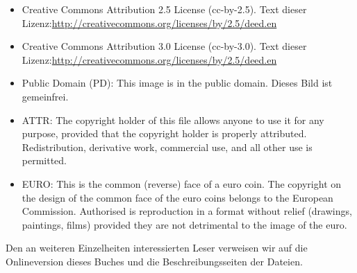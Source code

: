 \begin{small}
\begin{itemize}
\item Creative Commons Attribution 2.5 License (cc-by-2.5). Text dieser Lizenz:\newline{}\url{http://creativecommons.org/licenses/by/2.5/deed.en}

\item Creative Commons Attribution 3.0 License (cc-by-3.0). Text dieser Lizenz:\newline{}\url{http://creativecommons.org/licenses/by/2.5/deed.en}

\item Public Domain (PD): This image is in the public domain. Dieses Bild ist gemeinfrei.

\item ATTR:  The copyright holder of this file allows anyone to use it for any purpose, provided that the copyright holder is properly attributed. Redistribution, derivative work, commercial use, and all other use is permitted. 

\item EURO: This is the common (reverse) face of a euro coin. The copyright on the design of the common face of the euro coins belongs to the European Commission. Authorised is reproduction in a format without relief (drawings, paintings, films) provided they are not detrimental to the image of the euro.
\end{itemize}

Den an weiteren Einzelheiten interessierten Leser verweisen wir auf die Onlineversion dieses Buches und die Beschreibungsseiten der Dateien.

\end{small}

\pagebreak
